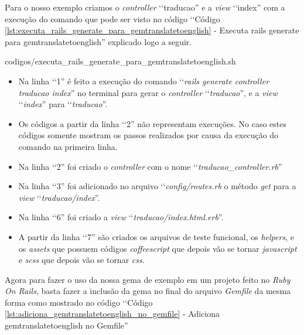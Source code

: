 Para o nosso exemplo criamos o \emph{controller} ‘‘traducao'' e a \emph{view} ‘‘index'' com a execução do 
comando que pode ser visto no código ‘‘Código \ref{lst:executa_rails_generate_para_gemtranslatetoenglish} - 
Executa rails generate para gemtranslatetoenglish'' explicado logo a seguir.


{codigos/executa_rails_generate_para_gemtranslatetoenglish.sh} 

\begin{itemize}

 \item Na linha ‘‘1'' é feito a execução do comando ‘‘\emph{rails generate controller traducao index}'' no 
 terminal para gerar o \emph{controller} ‘‘\emph{traducao}'', e a \emph{view} ‘‘\emph{index}'' para 
 ‘‘\emph{traducao}''.

 \item Os códigos a partir da linha ‘‘2'' não representam execuções. No caso estes códigos somente 
 mostram os passos realizados por causa da execução do comando na primeira linha.
 
 \item Na linha ‘‘2'' foi criado o \emph{controller} com o nome ‘‘\emph{traducao\_controller.rb}''
 
 \item Na linha ‘‘3'' foi adicionado no arquivo ‘‘\emph{config/routes.rb} o método \emph{get} para a 
 \emph{view} ‘‘\emph{traducao/index}''.
 
 \item Na linha ‘‘6'' foi criado a \emph{view} ‘‘\emph{traducao/index.html.erb}''.
 
 \item A partir da linha ‘‘7'' são criados os arquivos de teste funcional, os \emph{helpers}, e os 
 \emph{assets} que possuem códigos \emph{coffeescript} que depois vão se tornar \emph{javascript} e 
 \emph{scss} que depois vão se tornar \emph{css}.
 
\end{itemize}


Agora para fazer o uso da nossa gema de exemplo em um projeto feito no \emph{Ruby On Rails}, basta fazer a 
inclusão da gema no final do arquivo \emph{Gemfile} da mesma forma como mostrado no código ‘‘Código 
\ref{lst:adiciona_gemtranslatetoenglish_no_gemfile} - Adiciona gemtranslatetoenglish no Gemfile''
 
